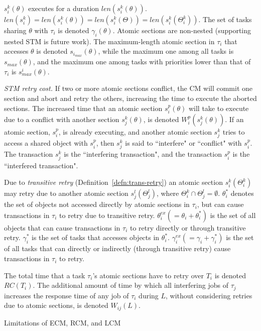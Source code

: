 \documentclass[twocolumn]{article}
\makeatletter
\def\section{\@startsection {section}{1}{\z@}{20pt plus 2pt minus 2pt}
{8pt plus 2pt minus 2pt}{\centering\normalsize\sc
\edef\@svsec{\thesection.\ }}}
\def\thesection{\Roman{section}}
\makeatother
\begin{document}
 $s_i^k(\theta)$  executes for a duration $len(s_i^k(\theta))$. $len(s_i^k)=len(s_i^k(\theta))=len(s_i^k(\Theta))=len(s_i^k(\Theta_i^k))$. The set of tasks sharing $\theta$ with $\tau_i$ is denoted $\gamma_i(\theta)$. Atomic sections are non-nested (supporting nested STM is future work). The maximum-length atomic section in $\tau_i$ that accesses $\theta$ is denoted $s_{i_{max}} (\theta)$, while the maximum one among all tasks is $s_{max} (\theta)$, and the maximum one among tasks with priorities lower than that of $\tau_i$ is $s_{max}^i (\theta)$.

\textit{STM retry cost.} If two or more atomic sections conflict, the CM will commit one section and abort and retry the others, increasing the time to execute the aborted sections. The increased time that an atomic section $s_i^p (\theta)$ will take to execute due to a conflict with another section $s_j^k (\theta)$, is denoted $W_{i}^{p}(s_{j}^{k}(\theta))$. If an atomic section, $s_i^p$, is already executing, and another atomic section $s_j^k$ tries to access a shared object with $s_i^p$, then $s_j^k$ is said to ``interfere" or ``conflict" with $s_i^p$. The transaction $s_j^k$ is the ``interfering transaction", and the transaction $s_i^p$ is the ``interfered transaction".

Due to \textit{transitive retry} 
(Definition~\ref{defn:trans-retry}) 
an atomic section $s_i^k(\Theta_i^k)$ may retry due to another atomic section $s_j^l(\Theta_j^l)$, where $\Theta_i^k \cap \Theta_j^l = \emptyset$. $\theta_i^*$ denotes the set of objects not accessed directly by atomic sections in $\tau_i$, but can cause transactions in $\tau_i$ to retry due to transitive retry. $\theta_i^{ex}(=\theta_i + \theta_i^*)$ is the set of all objects that can cause transactions in $\tau_i$ to retry directly or through transitive retry. $\gamma_i^*$ is the set of tasks that accesses  objects in $\theta_i^*$. $\gamma_i^{ex}(=\gamma_i + \gamma_i^*)$ is the set of all tasks that can directly or indirectly (through transitive retry) cause transactions in $\tau_i$ to retry.

The total time that a task $\tau_i$'s atomic sections have to retry over $T_i$ is denoted $RC(T_i)$. The additional amount of time by which all interfering jobs of $\tau_j$ increases the response time of any job of $\tau_i$ during $L$, without considering retries due to atomic sections, is denoted $W_{ij}(L)$.

\section{Limitations of ECM, RCM, and LCM}\label{probelm description}
\end{document}
